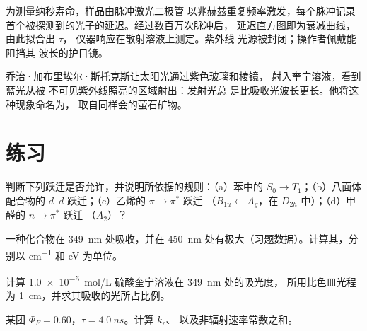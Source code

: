 \begin{inthelab}[时间相关单光子计数]
为测量纳秒寿命，样品由脉冲激光二极管
以兆赫兹重复频率激发，每个脉冲记录
首个被探测到的光子的延迟。经过数百万次脉冲后，
延迟直方图即为衰减曲线，由此拟合出 $\tau$，
仪器响应在散射溶液上测定。紫外线
光源被封闭；操作者佩戴能阻挡其
波长的护目镜。
\end{inthelab}

\begin{history}[斯托克斯，1852 年]
乔治·加布里埃尔·斯托克斯让太阳光通过紫色玻璃和棱镜，
射入奎宁溶液，看到蓝光从被
不可见紫外线照亮的区域射出：发射光总
是比吸收光波长更长。他将这种现象命名为，
取自同样会的萤石矿物。
\end{history}

\section{练习}

\begin{exercise}[$\star$]\label{exo:b3:electronic-spectroscopy:1}
判断下列跃迁是否允许，并说明所依据的规则：（a）苯中的 $S_0 \to T_1$；（b）八面体配合物的 $d$--$d$
跃迁；（c）乙烯的 $\pi\to\pi^*$ 跃迁
（$B_{1u} \leftarrow A_g$，在 $D_{2h}$ 中）；（d）甲醛的 $n\to\pi^*$ 跃迁
（$A_2$）？
\end{exercise}

\begin{exercise}[$\star$]\label{exo:b3:electronic-spectroscopy:2}
一种化合物在 \qty{349}{nm} 处吸收，并在
\qty{450}{nm} 处有极大（习题数据）。计算其，分别以 \unit{cm^{-1}}
和 eV 为单位。
\end{exercise}

\begin{exercise}[$\star$]\label{exo:b3:electronic-spectroscopy:3}
计算 \qty{1.0e-5}{mol/L} 硫酸奎宁溶液在 \qty{349}{nm} 处的吸光度，
所用比色皿光程为 \qty{1}{cm}，并求其吸收的光所占比例。
\end{exercise}

\begin{exercise}[$\star$]\label{exo:b3:electronic-spectroscopy:4}
某团 $\Phi_F = 0.60$，$\tau = \qty{4.0}{ns}$。计算 $k_r$、
以及非辐射速率常数之和。
\end{exercise}

